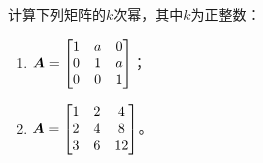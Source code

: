 \begin{problem}\label{problem-1.22}
计算下列矩阵的\(k\)次幂，其中\(k\)为正整数：

\begin{enumerate}
    \item \(\boldsymbol{A}=\begin{bmatrix}1&a&0\\0&1&a\\0&0&1\end{bmatrix}\)；
    \item \(\boldsymbol{A}=\begin{bmatrix}1&2&4\\2&4&8\\3&6&12\end{bmatrix}\)。
\end{enumerate}
\end{problem}
